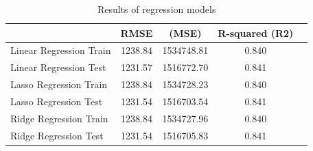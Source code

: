 \documentclass[12pt]{report}
\begin{document}
\begin{table}[h]
    \centering
    \begin{tabular}{|l|c|c|c|p{5cm}|} 
        \hline
        \textbf{ } & \textbf{RMSE} & \textbf{(MSE)} & \textbf{R-squared (R2)} \\
        \hline
        Linear Regression Train & 1238.84 & 1534748.81 & 0.840 \\
         \hline
         Linear Regression Test & 1231.57 & 1516772.70 & 0.841 \\
        \hline
        Lasso Regression Train & 1238.84 & 1534728.23 & 0.840 \\
         \hline
        Lasso Regression Test & 1231.54 & 1516703.54 & 0.841 \\
         \hline
        Ridge Regression Train & 1238.84 & 1534727.96 & 0.840 \\
        \hline
        Ridge Regression Test & 1231.54 & 1516705.83 & 0.841 \\
        \hline
  
    \end{tabular}
    
    \caption{Results of regression models}
    \label{tab:regression_results}
\end{table}
\end{document}
